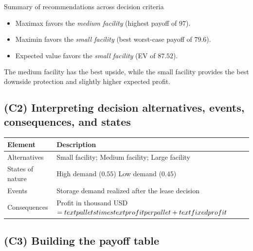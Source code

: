 \documentclass[11pt]{article}
\begin{document}
	Summary of recommendations across decision criteria
	\begin{itemize}
		\item Maximax favors the \emph{medium facility} (highest payoff of $97$).
		\item Maximin favors the \emph{small facility} (best worst-case payoff of $79.6$).
		\item Expected value favors the \emph{small facility} (EV of $87.52$).
	\end{itemize}
	
	
	The medium facility has the best upside, while the small facility provides the best downside protection and slightly
	higher expected profit.
	
	\subsection*{(C2) Interpreting decision alternatives, events, consequences, and states}
	
	\hypertarget{problem8-c2}{}
	
	\begin{center}
		\begin{tabular}{ll}
			\toprule
			Element & Description \\
			\midrule
			Alternatives & Small facility; Medium facility; Large facility \\
			States of nature & High demand
			($0.55$)
			Low demand
			($0.45$) \\
			Events & Storage demand realized after the lease decision \\
			Consequences & Profit in thousand USD $= \\text{pallets} \\times \\text{profit per pallet} + \\text{fixed profit}$ \\
			\bottomrule
		\end{tabular}
	\end{center}
	
	\subsection*{(C3) Building the payoff table}
	
	\hypertarget{problem8-c3}{}
	
\end{document}
